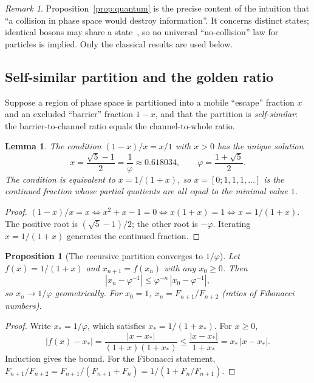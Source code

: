 \documentclass[11pt]{article}
\newtheorem{proposition}{Proposition}
\newtheorem{lemma}{Lemma}
\theoremstyle{definition}
\theoremstyle{remark}
\newtheorem{remark}{Remark}
\newcommand{\gr}{\varphi}
\begin{document}
\begin{remark}
Proposition~\ref{prop:quantum} is the precise content of the intuition that ``a collision in phase space would destroy information''. It concerns distinct states; identical bosons may share a state~\cite{Sakurai}, so no universal ``no-collision'' law for particles is implied. Only the classical results are used below.
\end{remark}

\subsection{Self-similar partition and the golden ratio}

Suppose a region of phase space is partitioned into a mobile ``escape'' fraction $x$ and an excluded ``barrier'' fraction $1-x$, and that the partition is \emph{self-similar}: the barrier-to-channel ratio equals the channel-to-whole ratio.

\begin{lemma}\label{lem:golden}
The condition $(1-x)/x = x/1$ with $x > 0$ has the unique solution
\begin{equation}
x = \frac{\sqrt5 - 1}{2} = \frac1\gr \approx 0.618034, \qquad \gr = \frac{1+\sqrt5}{2}.
\end{equation}
The condition is equivalent to $x = 1/(1+x)$, so $x = [0;1,1,1,\dots]$ is the continued fraction whose partial quotients are all equal to the minimal value $1$.
\end{lemma}
\begin{proof}
$(1-x)/x = x \iff x^2 + x - 1 = 0 \iff x(1+x) = 1 \iff x = 1/(1+x)$. The positive root is $(\sqrt5-1)/2$; the other root is $-\gr$. Iterating $x = 1/(1+x)$ generates the continued fraction.
\end{proof}

\begin{proposition}[The recursive partition converges to $1/\gr$]\label{prop:recursion}
Let $f(x) = 1/(1+x)$ and $x_{n+1} = f(x_n)$ with any $x_0 \ge 0$. Then
\begin{equation}
|x_n - \gr^{-1}| \le \gr^{-n}\,|x_0 - \gr^{-1}|,
\end{equation}
so $x_n \to 1/\gr$ geometrically. For $x_0 = 1$, $x_n = F_{n+1}/F_{n+2}$ (ratios of Fibonacci numbers).
\end{proposition}
\begin{proof}
Write $x_* = 1/\gr$, which satisfies $x_* = 1/(1+x_*)$. For $x \ge 0$,
\begin{equation}
|f(x) - x_*| = \frac{|x - x_*|}{(1+x)(1+x_*)} \le \frac{|x - x_*|}{1+x_*} = x_*\,|x - x_*|.
\end{equation}
Induction gives the bound. For the Fibonacci statement, $F_{n+1}/F_{n+2} = F_{n+1}/(F_{n+1}+F_n) = 1/(1 + F_n/F_{n+1})$.
\end{proof}
\end{document}
